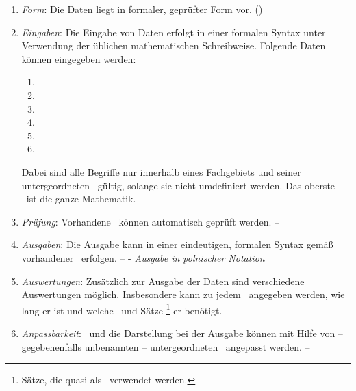 %
\begin{enumerate}

	\item \label{Anforderung-Form} \emph{Form}:
	Die Daten liegt in formaler, geprüfter Form vor.
	()

	\item \label{Anforderung-Eingaben} \emph{Eingaben}:
	Die Eingabe von Daten erfolgt in einer formalen Syntax unter Verwendung der üblichen mathematischen Schreibweise.
	Folgende Daten können eingegeben werden:
	\begin{enumerate}
		\item \Axiome
		\item \Saetze
		\item \Beweise
		\item \Fachbegriffe
		\item \Fachgebiete
		\item \Ausgabeschemata
	\end{enumerate}
	Dabei sind alle Begriffe nur innerhalb eines Fachgebiets und seiner untergeordneten \Fachgebiete\ gültig, solange sie nicht umdefiniert werden.
	Das oberste \Fachgebiet\ ist die ganze Mathematik.
	-- 

	\item \label{Anforderung-Pruefung} \emph{Prüfung}:
	Vorhandene \Beweise\ können automatisch geprüft werden.
	-- 

	\item \label{Anforderung-Ausgaben} \emph{Ausgaben}:
	Die Ausgabe kann in einer eindeutigen, formalen Syntax gemäß vorhandener \Ausgabeschemata\ erfolgen.
	--  - \emph{Ausgabe in polnischer Notation}

	\item \label{Anforderung-Auswertungen} \emph{Auswertungen}:
	Zusätzlich zur Ausgabe der Daten sind verschiedene Auswertungen möglich.
	Insbesondere kann zu jedem \Beweis\ angegeben werden, wie lang er ist und welche \Axiome\ und Sätze%
	\footnote{Sätze, die quasi als \Axiome\ verwendet werden.}
	er benötigt.
	-- 

	\item \label{Anforderung-Anpassbarkeit} \emph{Anpassbarkeit}:
	\Fachbegriffe\ und die Darstellung bei der Ausgabe können mit Hilfe von -- gegebenenfalls unbenannten -- untergeordneten \Fachgebieten\ angepasst werden.
	-- 


\end{enumerate}
